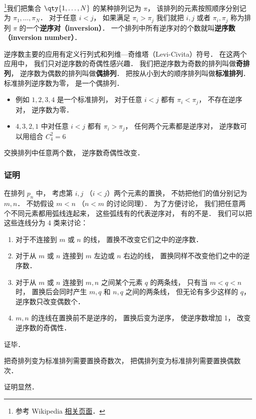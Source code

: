 

\footnote{参考 Wikipedia \href{https://en.wikipedia.org/wiki/Inversion_(discrete_mathematics)}{相关页面}．}我们把集合 $\qty{1,\dots,N}$ 的某种排列记为 $\pi$， 该排列的元素按照顺序分别记为 $\pi_1, \dots, \pi_N$． 对于任意 $i < j$， 如果满足 $\pi_i > \pi_j$ 我们就把 $i, j$ 或者 $\pi_i, \pi_j$ 称为排列 $\pi$ 的一个\textbf{逆序对（inversion）}． 一个排列中所有逆序对的个数就叫\textbf{逆序数（inversion number）}．

逆序数主要的应用有定义行列式和列维—奇维塔（Levi-Civita）符号． 在这两个应用中， 我们只对逆序数的奇偶性感兴趣． 我们把逆序数为奇数的排列叫做\textbf{奇排列}， 逆序数为偶数的排列叫做\textbf{偶排列}． 把按从小到大的顺序排列叫做\textbf{标准排列}． 标准排列逆序数为零， 是一个偶排列．

\begin{example}{}
\begin{itemize}
\item 例如 $1,2,3,4$ 是一个标准排列， 对于任意 $i < j$ 都有 $\pi_i < \pi_j$， 不存在逆序对， 逆序数为零．
\item $4,3,2,1$ 中对任意 $i < j$ 都有 $\pi_i > \pi_j$， 任何两个元素都是逆序对， 逆序数可以用组合 $C_4^2 = 6$
\end{itemize}
\end{example}

\begin{theorem}{}
交换排列中任意两个数， 逆序数奇偶性改变． 
\end{theorem}

\subsubsection{证明}
在排列 $p_n$ 中， 考虑第 $i, j$ （$i < j$）两个元素的置换， 不妨把他们的值分别记为 $m, n$． 不妨假设 $m < n$ （$n < m$ 的讨论同理）． 为了方便讨论， 我们把任意两个不同元素都用弧线连起来， 这些弧线有的代表逆序对， 有的不是． 我们可以把这些连线分为 4 类来讨论：
\begin{enumerate}
\item 对于不连接到 $m$ 或 $n$ 的线， 置换不改变它们之中的逆序数．
\item 对于从 $m$ 或 $n$ 连接到 $m$ 左边或 $n$ 右边的线， 置换同样不改变他们之中的逆序数．
\item 对于从 $m$ 或 $n$ 连接到 $m, n$ 之间某个元素 $q$ 的两条线， 只有当 $m < q < n$ 时， 置换后会同时产生 $m,q$ 和 $n,q$ 之间的两条线， 但无论有多少这样的 $q$， 逆序数只改变偶数个．
\item $m,n$ 的连线在置换前不是逆序的， 置换后变为逆序， 使逆序数增加 1， 改变逆序数的奇偶性．
\end{enumerate}
证毕．

\begin{corollary}{}
把奇排列变为标准排列需要置换奇数次， 把偶排列变为标准排列需要置换偶数次．
\end{corollary}
证明显然．

